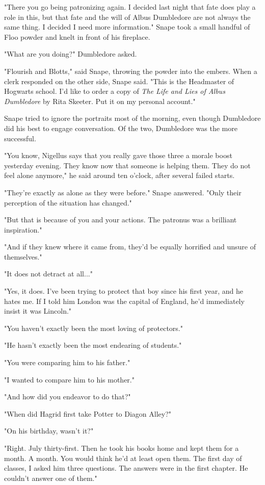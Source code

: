 "There you go being patronizing again. I decided last night that fate does play a role in this, but that fate and the will of Albus Dumbledore are not always the same thing. I decided I need more information." Snape took a small handful of Floo powder and knelt in front of his fireplace.

"What are you doing?" Dumbledore asked.

"Flourish and Blotts," said Snape, throwing the powder into the embers. When a clerk responded on the other side, Snape said. "This is the Headmaster of Hogwarts school. I'd like to order a copy of \emph{The Life and Lies of Albus Dumbledore} by Rita Skeeter. Put it on my personal account."

Snape tried to ignore the portraits most of the morning, even though Dumbledore did his best to engage conversation. Of the two, Dumbledore was the more successful.

"You know, Nigellus says that you really gave those three a morale boost yesterday evening. They know now that someone is helping them. They do not feel alone anymore," he said around ten o'clock, after several failed starts.

"They're exactly as alone as they were before." Snape answered. "Only their perception of the situation has changed."

"But that is because of you and your actions. The patronus was a brilliant inspiration."

"And if they knew where it came from, they'd be equally horrified and unsure of themselves."

"It does not detract at all..."

"Yes, it does. I've been trying to protect that boy since his first year, and he hates me. If I told him London was the capital of England, he'd immediately insist it was Lincoln."

"You haven't exactly been the most loving of protectors."

"He hasn't exactly been the most endearing of students."

"You were comparing him to his father."

"I wanted to compare him to his mother."

"And how did you endeavor to do that?"

"When did Hagrid first take Potter to Diagon Alley?"

"On his birthday, wasn't it?"

"Right. July thirty-first. Then he took his books home and kept them for a month. A month. You would think he'd at least open them. The first day of classes, I asked him three questions. The answers were in the first chapter. He couldn't answer one of them."

